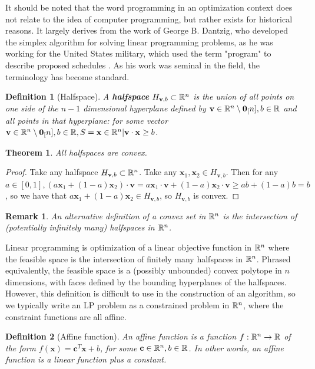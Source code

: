\documentclass[10pt]{article}
\renewcommand{\vec}[1]{\mathbf{#1}}
\newcommand{\R}[1][]{ \ifx&#1& \mathbb{R} \else \mathbb{R}^{#1} \fi }
\newcommand{\affcomb}[3][a]{#1#2 + (1-#1)#3}
\newcommand{\x}{\vec{x}}
\newcommand{\vz}[1]{\vec{0}_{#1}}
\renewcommand{\c}{\vec{c}}
\newtheorem*{definition}{Definition}
\newtheorem{theorem}{Theorem}[section]
\newtheorem*{remark}{Remark}
\begin{document}
It should be noted that the word programming in an optimization context does not relate to the idea of computer programming, but rather exists for historical reasons. It largely derives from the work of George B. Dantzig, who developed the simplex algorithm for solving linear programming problems, as he was working for the United States military, which used the term "program" to describe proposed schedules \cite{dantzig}. As his work was seminal in the field, the terminology has become standard.
\begin{definition}[Halfspace]
	A \textbf{halfspace} $H_{\vec{v},b}\subset\R[n]$ is the union of all points on one side of the $n-1$ dimensional hyperplane defined by $\vec{v}\in\R[n]\setminus\vz[n], b\in\R$ and all points in that hyperplane: for some vector $\vec{v}\in\R[n]\setminus\vz[n], b\in\R, S = {\x\in\R[n] | \vec{v}\cdot\x \geq b}$.
\end{definition}
\begin{theorem}
	All halfspaces are convex.
\end{theorem}
\begin{proof}
	Take any halfspace $H_{\vec{v},b}\subset\R[n]$. Take any $\x_1, \x_2\in H_{\vec{v},b}$. Then for any $a\in[0,1], (\affcomb{\x_1}{\x_2})\cdot\vec{v} = \affcomb{\x_1\cdot\vec{v}}{\x_2\cdot\vec{v}} \geq \affcomb{b}{b} = b$, so we have that $\affcomb{\x_1}{\x_2}\in H_{\vec{v},b}$, so $H_{\vec{v},b}$ is convex.
\end{proof}
\begin{remark}
	An alternative definition of a convex set in $\R[n]$ is the intersection of (potentially infinitely many) halfspaces in $\R[n]$.
\end{remark}
Linear programming is optimization of a linear objective function in $\R[n]$ where the feasible space is the intersection of finitely many halfspaces in $\R[n]$. Phrased equivalently, the feasible space is a (possibly unbounded) convex polytope in $n$ dimensions, with faces defined by the bounding hyperplanes of the halfspaces. However, this definition is difficult to use in the construction of an algorithm, so we typically write an LP problem as a constrained problem in $\R[n]$, where the constraint functions are all affine.
\begin{definition}[Affine function]
An affine function is a function $f:\R[n]\to\R$ of the form $f(\x) = \c^T\x + b$, for some $\c\in\R[n], b\in\R$. In other words, an affine function is a linear function plus a constant.
\end{definition}
\end{document}
